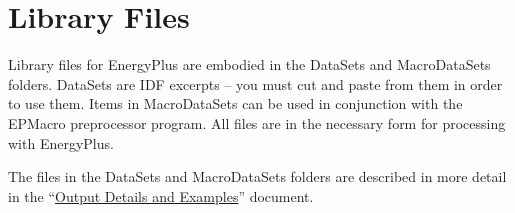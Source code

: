 \section{Library Files}\label{library-files}

Library files for EnergyPlus are embodied in the DataSets and MacroDataSets folders. DataSets are IDF excerpts -- you must cut and paste from them in order to use them. Items in MacroDataSets can be used in conjunction with the EPMacro preprocessor program. All files are in the necessary form for processing with EnergyPlus.

The files in the DataSets and MacroDataSets folders are described in more detail in the ``\href{file:///E:/Docs4PDFs/OutputDetailsAndExamples.pdf}{Output Details and Examples}'' document.
